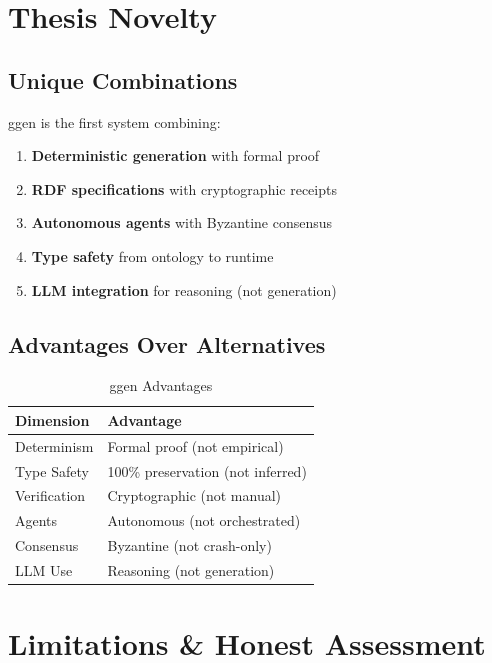 \section{Thesis Novelty}

\subsection{Unique Combinations}

ggen is the first system combining:

\begin{enumerate}
    \item \textbf{Deterministic generation} with formal proof
    \item \textbf{RDF specifications} with cryptographic receipts
    \item \textbf{Autonomous agents} with Byzantine consensus
    \item \textbf{Type safety} from ontology to runtime
    \item \textbf{LLM integration} for reasoning (not generation)
\end{enumerate}

\subsection{Advantages Over Alternatives}

\begin{table}[h]
\centering
\caption{ggen Advantages}
\begin{tabular}{ll}
\toprule
\textbf{Dimension} & \textbf{Advantage} \\
\midrule
Determinism & Formal proof (not empirical) \\
Type Safety & 100\% preservation (not inferred) \\
Verification & Cryptographic (not manual) \\
Agents & Autonomous (not orchestrated) \\
Consensus & Byzantine (not crash-only) \\
LLM Use & Reasoning (not generation) \\
\bottomrule
\end{tabular}
\end{table}

\section{Limitations \& Honest Assessment}

